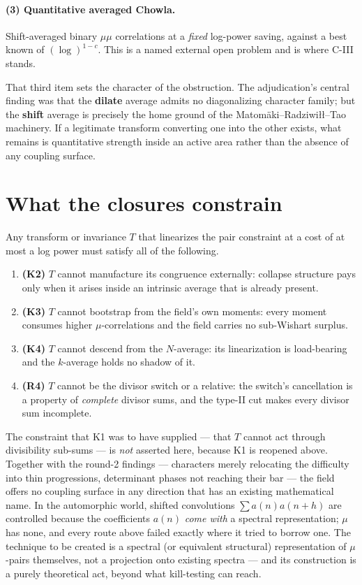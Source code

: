 \documentclass[11pt,a4paper]{article}
\theoremstyle{plain}
\theoremstyle{definition}
\begin{document}
\paragraph{(3) Quantitative averaged Chowla.} Shift-averaged binary
$\mu\mu$ correlations at a \emph{fixed} log-power saving, against a
best known of $(\log)^{1-c}$. This is a named external open problem
and is where C-III stands.

That third item sets the character of the obstruction. The
adjudication's central finding was that the \textbf{dilate} average
admits no diagonalizing character family; but the \textbf{shift}
average is precisely the home ground of the
Matom\"aki--Radziwi\l\l--Tao machinery. If a legitimate transform
converting one into the other exists, what remains is quantitative
strength inside an active area rather than the absence of any coupling
surface.

\section{What the closures constrain}

Any transform or invariance $T$ that linearizes the pair constraint at
a cost of at most a log power must satisfy all of the following.

\begin{enumerate}
\item \textbf{(K2)} $T$ cannot manufacture its congruence externally:
  collapse structure pays only when it arises inside an intrinsic
  average that is already present.
\item \textbf{(K3)} $T$ cannot bootstrap from the field's own moments:
  every moment consumes higher $\mu$-correlations and the field
  carries no sub-Wishart surplus.
\item \textbf{(K4)} $T$ cannot descend from the $N$-average: its
  linearization is load-bearing and the $k$-average holds no shadow
  of it.
\item \textbf{(R4)} $T$ cannot be the divisor switch or a relative:
  the switch's cancellation is a property of \emph{complete} divisor
  sums, and the type-II cut makes every divisor sum incomplete.
\end{enumerate}

\noindent
The constraint that K1 was to have supplied --- that $T$ cannot act
through divisibility sub-sums --- is \emph{not} asserted here, because
K1 is reopened above. Together with the round-2 findings ---
characters merely relocating the difficulty into thin progressions,
determinant phases not reaching their bar --- the field offers no
coupling surface in any direction that has an existing mathematical
name. In the automorphic world, shifted convolutions
$\sum a(n)a(n+h)$ are controlled because the coefficients $a(n)$
\emph{come with} a spectral representation; $\mu$ has none, and every
route above failed exactly where it tried to borrow one. The technique
to be created is a spectral (or equivalent structural) representation
of $\mu$-pairs themselves, not a projection onto existing spectra ---
and its construction is a purely theoretical act, beyond what
kill-testing can reach.
\end{document}
